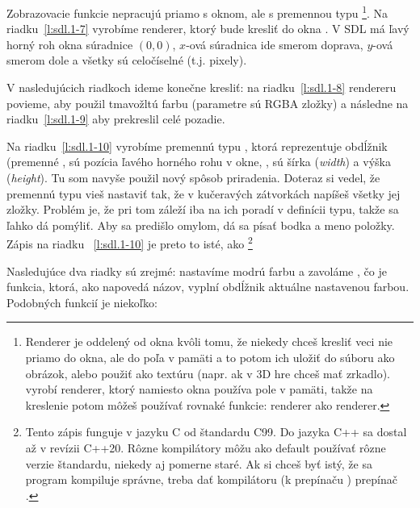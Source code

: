 Zobrazovacie funkcie nepracujú priamo s oknom, ale s premennou typu \footnote{Renderer je oddelený od okna kvôli tomu, že niekedy chceš 
kresliť veci nie priamo do okna, ale do poľa v pamäti
a to potom ich uložiť do súboru ako obrázok, 
alebo použiť ako textúru (napr. ak v 3D hre chceš mať zrkadlo).  vyrobí renderer, ktorý namiesto okna používa pole v pamäti,
takže na kreslenie potom môžeš používať rovnaké funkcie: renderer ako renderer.}. Na riadku~\ref{l:sdl.1-7} vyrobíme renderer, ktorý bude kresliť do okna .
V SDL má ľavý horný roh okna súradnice $(0,0)$, $x$-ová súradnica ide smerom doprava, $y$-ová smerom dole a všetky sú celočíselné (t.j. pixely).

V nasledujúcich riadkoch ideme konečne kresliť: na riadku~\ref{l:sdl.1-8} rendereru povieme, aby použil tmavožltú farbu (parametre sú RGBA zložky) 
a následne na riadku~\ref{l:sdl.1-9} aby prekreslil celé pozadie. 

Na riadku~\ref{l:sdl.1-10} vyrobíme premennú typu , ktorá reprezentuje obdĺžnik (premenné ,  sú pozícia ľavého horného rohu v okne,
,  sú šírka ({\em width}) a výška ({\em height}). Tu som navyše použil nový spôsob priradenia. 
Doteraz si vedel, že premennú typu 
vieš nastaviť tak,
že v kučeravých zátvorkách napíšeš všetky jej zložky. Problém je, že pri tom záleží iba na ich poradí v definícii typu, takže sa ľahko dá pomýliť. 
Aby sa predišlo omylom, dá sa písať bodka a meno položky.
Zápis na riadku ~\ref{l:sdl.1-10} je preto to isté, ako \footnote{%
  Tento zápis funguje v jazyku C od štandardu C99. Do jazyka C++ sa dostal až v revízii C++20. Rôzne kompilátory môžu ako default používať rôzne verzie štandardu, niekedy
  aj pomerne staré. Ak si chceš byť istý, že sa program kompiluje správne, treba dať kompilátoru (k prepínaču ) prepínač .
}

Nasledujúce dva riadky sú zrejmé: nastavíme modrú farbu  a zavoláme , čo je funkcia, ktorá, ako napovedá názov, vyplní obdĺžnik aktuálne nastavenou farbou.
Podobných funkcií je niekoľko:\\

